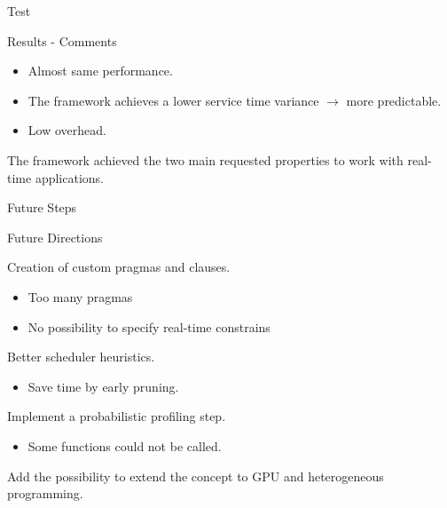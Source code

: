 \documentclass[xcolor=dvipsnames]{beamer}
\begin{document}
\begin{section}{Test}
\begin{frame}{\hskip 0.3cm Results - Comments}
\begin{itemize}
\item Almost same performance.

\item The framework achieves a lower service time variance $\rightarrow$ more predictable.

\item Low overhead.

\end{itemize}

The framework achieved the two main requested properties to work with real-time applications.

\end{frame}












\end{section}
\begin{section}{Future Steps}



\begin{frame}{\hskip 0.3cm Future Directions}



 Creation of custom pragmas and clauses.

\begin{itemize}

\item Too many pragmas 

\item No possibility to specify real-time constrains

\end{itemize}

  Better scheduler heuristics.

\begin{itemize}

\item Save time by early pruning.

\end{itemize}

 Implement a probabilistic profiling step.

\begin{itemize}

\item Some functions could not be called.

\end{itemize}

 Add the possibility to extend the concept to GPU and heterogeneous programming.




\end{frame}












\end{section}
\end{document}
